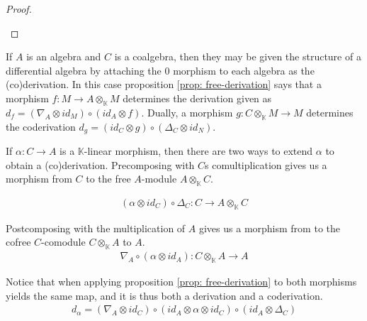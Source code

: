 \documentclass[../thesis.tex]{subfiles}
\begin{document}
\begin{proof}
\begin{center}
                \end{center}
            \end{proof}

            If $A$ is an algebra and $C$ is a coalgebra, then they may be given the structure of a differential algebra by attaching the $0$ morphism to each algebra as the (co)derivation. In this case proposition \ref{prop: free-derivation} says that a morphism $f : M \rightarrow A \otimes_\mathbb{K} M$ determines the derivation given as $d_f = (\nabla_A \otimes id_M) \circ (id_A\otimes f)$. Dually, a morphism $g : C \otimes_\mathbb{K} M \rightarrow M$ determines the coderivation $d_g = (id_C \otimes g) \circ (\Delta_C \otimes id_N)$.

            If $\alpha : C \rightarrow A$ is a $\mathbb{K}$-linear morphism, then there are two ways to extend $\alpha$ to obtain a (co)derivation. Precomposing with $C$s comultiplication gives us a morphism from $C$ to the free $A$-module $A\otimes_\mathbb{K} C$.  

            \begin{align*}
                (\alpha \otimes id_C) \circ \Delta_C : C \rightarrow A \otimes_\mathbb{K} C
            \end{align*}

            Postcomposing with the multiplication of $A$ gives us a morphism from to the cofree $C$-comodule $C\otimes_\mathbb{K}A$ to $A$.
            \begin{align*}
                \nabla_A \circ (\alpha \otimes id_A) : C \otimes_\mathbb{K} A \rightarrow A
            \end{align*}

            Notice that when applying proposition \ref{prop: free-derivation} to both morphisms yields the same map, and it is thus both a derivation and a coderivation.
            \begin{align*}
                d_\alpha = (\nabla_A\otimes id_C) \circ (id_A \otimes \alpha \otimes id_C) \circ (id_A \otimes \Delta_C)
            \end{align*}
\end{document}
